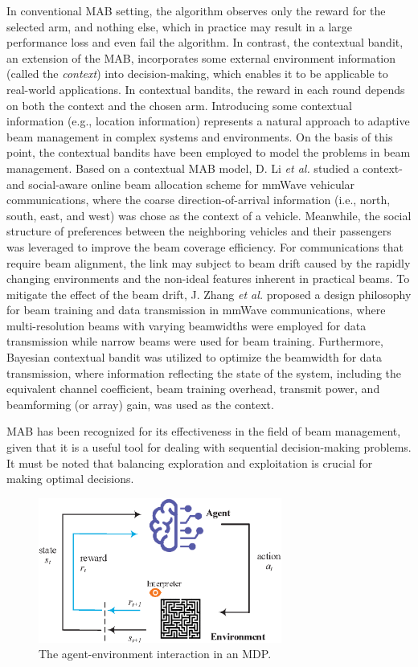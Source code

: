 \documentclass[journal,comsoc]{IEEEtran}
\begin{document}
In conventional MAB setting, the algorithm observes only the reward for the selected arm, and nothing else, which in practice may result in a large performance loss and even fail the algorithm. In contrast, the contextual bandit, an extension of the MAB, incorporates some external environment information (called the \emph{context}) into decision-making, which enables it to be applicable to real-world applications. In contextual bandits, the reward in each round depends on both the context and the chosen arm. Introducing some contextual information (e.g., location information) represents a natural approach to adaptive beam management in complex systems and environments. On the basis of this point, the contextual bandits have been employed to model the problems in beam management. Based on a contextual MAB model, D. Li \emph{et al.} \cite{Context-and-Social-Aware-Online-Beam-Selection-2021} studied a context- and social-aware online beam allocation scheme for mmWave vehicular communications, where the coarse direction-of-arrival information (i.e., north, south, east, and west) was chose as the context of a vehicle. Meanwhile, the social structure of preferences between the neighboring vehicles and their passengers was leveraged to improve the beam coverage efficiency. For communications that require beam alignment, the link may subject to beam drift caused by the rapidly changing environments and the non-ideal features inherent in practical beams. To mitigate the effect of the beam drift, J. Zhang \emph{et al.} \cite{Beam-Drift-2021} proposed a design philosophy for beam training and data transmission in mmWave communications, where multi-resolution beams with varying beamwidths were employed for data transmission while narrow beams were used for beam training. Furthermore, Bayesian contextual bandit was utilized to optimize the beamwidth for data transmission, where information reflecting the state of the system, including the equivalent channel coefficient, beam training overhead, transmit power, and beamforming (or array) gain, was used as the context.

MAB has been recognized for its effectiveness in the field of beam management, given that it is a useful tool for dealing with sequential decision-making problems. It must be noted that balancing exploration and exploitation is crucial for making optimal decisions.


\begin{figure}[t]
	\centering
	\includegraphics[width=8cm]{MDP.eps}
	\caption{The agent-environment interaction in an MDP.}
	\label{fig:MDP}
\end{figure}
\end{document}
